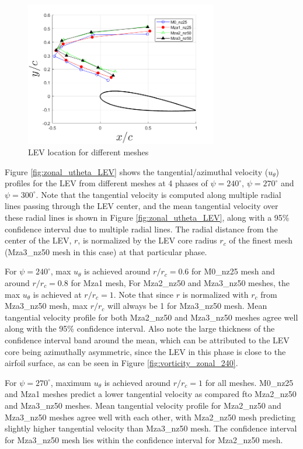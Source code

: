 \begin{figure}[H]
	\centering
	\includegraphics[width=0.75\textwidth]{figures/zonal_adapt_results/LEV/LEV_location}
	\caption{ LEV location for different meshes}
	\label{fig:zonal_LEV_location}
\end{figure}

Figure \ref{fig:zonal_utheta_LEV} shows the tangential/azimuthal velocity ($u_{\theta}$) profiles for the LEV from different meshes at 4 phases of $\psi = 240^\circ$,  $\psi = 270^\circ$ and  $\psi = 300^\circ$. 
Note that the tangential velocity is computed along multiple radial lines passing through the LEV center, and the mean tangential velocity over these radial lines is shown in Figure \ref{fig:zonal_utheta_LEV}, along with a 95\% confidence interval due to multiple radial lines.
The radial distance from the center of the LEV, $r$, is normalized by the LEV core radius $r_c$ of the finest mesh (Mza3\_nz50 mesh in this case) at that particular phase. 

For $\psi = 240^\circ$, max $u_\theta$ is achieved around $r/r_c = 0.6$ for M0\_nz25 mesh and around $r/r_c = 0.8$ for Mza1 mesh, 
For Mza2\_nz50 and Mza3\_nz50 meshes, the max $u_\theta$ is achieved at $r/r_c = 1$. Note that since $r$ is normalized with $r_c$ from Mza3\_nz50 mesh, max $r/r_c$ will always be 1 for Mza3\_nz50 mesh. 
Mean tangential velocity profile for both Mza2\_nz50 and Mza3\_nz50 meshes agree well along with the 95\% confidence interval. 
Also note the large thickness of the confidence interval band around the mean, which can be attributed to the LEV core being azimuthally asymmetric, since the LEV in this phase is close to the airfoil surface, as can be seen in Figure \ref{fig:vorticity_zonal_240}.

For $\psi = 270^\circ$, maximum $u_\theta$ is achieved around $r/r_c= 1$ for all meshes. 
M0\_nz25 and Mza1 meshes predict a lower tangential velocity as compared fto Mza2\_nz50 and Mza3\_nz50 meshes. 
Mean tangential velocity profile for Mza2\_nz50 and Mza3\_nz50 meshes agree well with each other, with Mza2\_nz50 mesh predicting slightly higher tangential velocity than Mza3\_nz50 mesh. 
The confidence interval for Mza3\_nz50 mesh lies within the confidence interval for Mza2\_nz50 mesh.

